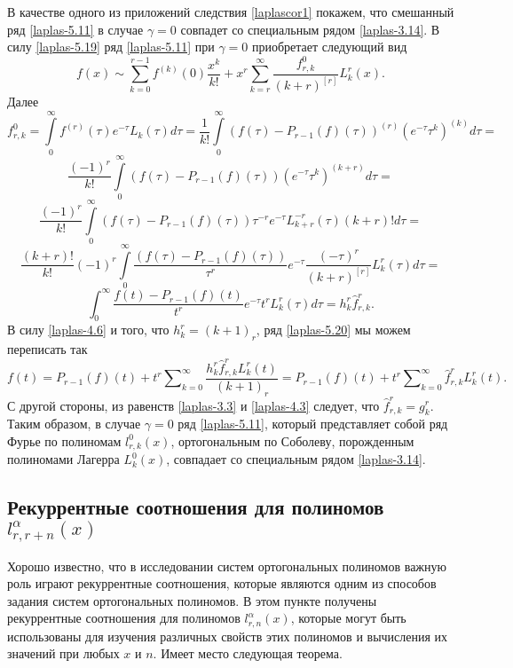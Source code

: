 В качестве одного из приложений следствия \ref{laplascor1} покажем, что
 смешанный ряд \eqref{laplas-5.11} в случае $\gamma=0$ совпадет со специальным рядом \eqref{laplas-3.14}.  В силу \eqref{laplas-5.19} ряд \eqref{laplas-5.11} при $\gamma=0$ приобретает следующий вид
\begin{equation}\label{laplas-5.20}
f(x)\sim \sum_{k=0}^{r-1} f^{(k)}(0)\frac{x^k}{k!}+ x^{r}\sum_{k=r}^\infty  \frac{f_{r,k}^0}{(k+r)^{[r]}} L_{k}^{r}(x).
\end{equation}
Далее
\begin{equation*}
  {f}_{r,k}^0=\int\limits_0^\infty f^{(r)}(\tau)e^{-\tau}L_k(\tau)d\tau=\frac1{k!}\int\limits_0^\infty(f(\tau)-P_{r-1}(f)(\tau))^{(r)}(e^{-\tau}\tau^k)^{(k)}d\tau=
\end{equation*}
\begin{equation*}
  \frac{(-1)^r}{k!}\int\limits_0^\infty(f(\tau)-P_{r-1}(f)(\tau))(e^{-\tau}\tau^k)^{(k+r)}d\tau=
\end{equation*}
\begin{equation*}
  \frac{(-1)^r}{k!}\int\limits_0^\infty(f(\tau)-P_{r-1}(f)(\tau))\tau^{-r}e^{-\tau}L_{k+r}^{-r}(\tau)(k+r)!d\tau=
\end{equation*}
\begin{equation*}
  \frac{(k+r)!}{k!}(-1)^r\int\limits_0^\infty\frac{(f(\tau)-P_{r-1}(f)(\tau))}{\tau^r}e^{-\tau}\frac{(-\tau)^r}{(k+r)^{[r]}}L_k^r(\tau)d\tau=
\end{equation*}
\begin{equation}\label{laplas-4.6}
  \int_0^\infty\frac{f(t)-P_{r-1}(f)(t)}{t^r}e^{-\tau}t^rL_k^r(\tau)d\tau=h_k^r\hat{f}_{r,k}^r.
\end{equation}
В силу \eqref{laplas-4.6} и того, что  $h_k^r=(k+1)_r$, ряд \eqref{laplas-5.20} мы можем переписать так
\begin{equation*}
  f(t)=P_{r-1}(f)(t)+t^r\sum\nolimits_{k=0}^\infty\frac{h_k^r\hat{f}_{r,k}^rL_k^r(t)}{(k+1)_r}=
  P_{r-1}(f)(t)+t^r\sum\nolimits_{k=0}^\infty\hat{f}_{r,k}^rL_k^r(t).
\end{equation*}
 С другой стороны, из равенств \eqref{laplas-3.3} и \eqref{laplas-4.3} следует, что $\hat{f}_{r,k}^r=g_k^r$. Таким образом, в случае $\gamma=0$ ряд  \eqref{laplas-5.11}, который представляет собой ряд Фурье по полиномам $l_{r,k}^{0}(x)$, ортогональным по Соболеву, порожденным полиномами Лагерра $L_k^0(x)$,   совпадает со специальным рядом \eqref{laplas-3.14}.

\subsection{Рекуррентные соотношения для полиномов $l_{r,r+n}^{\alpha}(x)$}
Хорошо известно, что в исследовании систем ортогональных полиномов важную роль играют рекуррентные соотношения, которые являются одним из способов задания систем ортогональных полиномов.
В этом пункте получены рекуррентные соотношения для полиномов $l_{r,n}^\alpha(x)$, которые могут быть использованы для изучения различных свойств этих полиномов и вычисления их значений при любых $x$ и $n$.
Имеет место следующая теорема.

